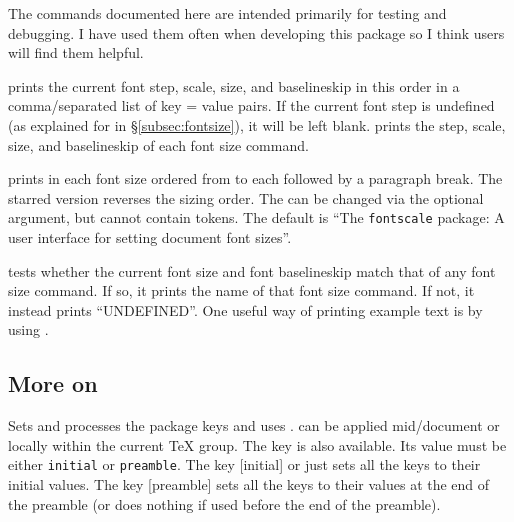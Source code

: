 \documentclass{beery}
\begin{document}
The commands documented here are intended primarily for testing and debugging.
I have used them often when developing this package so I think users will find them helpful.

\nopagebreak\newline
{}

 prints the current font step, scale, size, and baselineskip in this order in a comma\-/separated list of key = value pairs.
If the current font step is undefined (as explained for  in \S\ref{subsec:fontsize}), it will be left blank.
 prints the step, scale, size, and baselineskip of each font size command.

\nopagebreak\newline
{}

 prints  in each font size ordered from  to  each followed by a paragraph break.
The starred version  reverses the sizing order.
The  can be changed via the optional argument, but cannot contain  tokens.
The default  is \enquote{The \texttt{fontscale} package: A user interface for setting document font sizes}.

\KeepNextPar*

 tests whether the current font size and font baselineskip match that of any font size command.
If so, it prints the name of that font size command.
If not, it instead prints \enquote{UNDEFINED\@}.
One useful way of printing example text is by using
.

\subsection
  {%
    \texorpdfstring
      {More on }
      {More on \textbackslash{}fontscalesetup}%
  }
\label{subsec:fontscalesetup}

\KeepNextPar*

Sets and processes the  package keys and uses .
 can be applied mid\-/document or locally within the current \TeX{} group.
The key  is also available.
Its value must be either \texttt{initial} or \texttt{preamble}.
The key [initial] or just  sets all the keys to their initial values.
The key [preamble] sets all the keys to their values at the end of the preamble (or does nothing if used before the end of the preamble).
\end{document}
